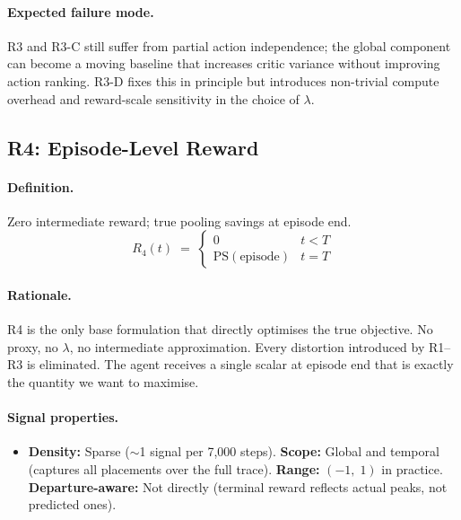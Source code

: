 \documentclass[11pt]{article}
\begin{document}
\paragraph{Expected failure mode.}
R3 and R3-C still suffer from partial action independence; the global
component can become a moving baseline that increases critic variance
without improving action ranking.  R3-D fixes this in principle but
introduces non-trivial compute overhead and reward-scale sensitivity in
the choice of $\lambda$.

\subsection{R4: Episode-Level Reward}
\label{sec:r4}

\paragraph{Definition.}
Zero intermediate reward; true pooling savings at episode end.
\begin{equation}
\boxed{
  R_4(t)
  \;=\;
  \begin{cases}
    0 & t < T \\[4pt]
    \mathrm{PS}(\text{episode}) & t = T
  \end{cases}
}
\label{eq:r4}
\end{equation}

\paragraph{Rationale.}
R4 is the only base formulation that directly optimises the true
objective.  No proxy, no $\lambda$, no intermediate approximation.
Every distortion introduced by R1--R3 is eliminated.  The agent receives
a single scalar at episode end that is exactly the quantity we want to
maximise.

\paragraph{Signal properties.}
\begin{itemize}
  \item \textbf{Density:} Sparse ($\sim$1 signal per 7{,}000 steps).
        \quad \textbf{Scope:} Global and temporal (captures all placements
        over the full trace). \quad \textbf{Range:} $(-1,\; 1)$ in
        practice. \quad \textbf{Departure-aware:} Not directly (terminal
        reward reflects actual peaks, not predicted ones).
\end{itemize}
\end{document}
